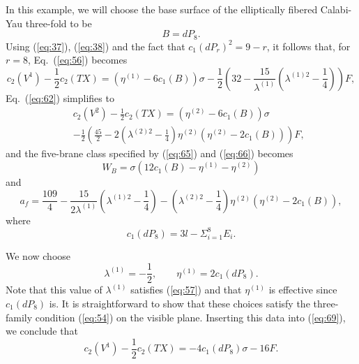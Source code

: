 \documentclass[a4paper,12pt]{article}
\numberwithin{equation}{section}
\theoremstyle{plain}
\begin{document}
In this example, we will choose the base surface of the elliptically fibered
Calabi-Yau three-fold to be
%
\begin{equation}
B=dP_{8}.
\label{eq:68}
\end{equation}
%
Using (\ref{eq:37}), (\ref{eq:38}) and the fact that $c_{1}(dP_{r})^{2}=9-r$, it
follows that, for $r=8$, Eq.~(\ref{eq:56}) becomes 
%
\begin{equation}
c_{2}(V^{1})-\frac{1}{2}c_{2}(TX)=(\eta^{(1)}-6c_{1}(B))\sigma
-\frac{1}{2}\left(32-\frac{15}{\lambda^{(1)}}
\left(\lambda^{(1)2}-\frac{1}{4}\right)\right)F,
\label{eq:69}
\end{equation}
%
Eq.~(\ref{eq:62}) simplifies to
%
\begin{eqnarray}
\nonumber
& & c_{2}(V^{2})-\frac{1}{2}c_{2}(TX)=(\eta^{(2)}-6c_{1}(B))\sigma \\
& & -\frac{1}{2}\left(\frac{45}{2} -2\left(\lambda^{(2)2}-\frac{1}{4}\right)\eta^{(2)}(\eta^{(2)}-2c_{1}(B))\right)F,
\label{eq:70}
\end{eqnarray}
%
and the five-brane class specified by (\ref{eq:65}) and (\ref{eq:66}) becomes
%
\begin{equation}
W_{B}=\sigma(12c_{1}(B)-\eta^{(1)}-\eta^{(2)})
\label{eq:71}
\end{equation}
%
and
%
\begin{equation}
a_{f}= \frac{109}{4}
-\frac{15}{2\lambda^{(1)}}\left(\lambda^{(1)2}-\frac{1}{4}\right)
-\left(\lambda^{(2)2}-\frac{1}{4}\right)\eta^{(2)}(\eta^{(2)}-2c_{1}(B)),
\label{eq:72}
\end{equation}
%
where
%
\begin{equation}
c_{1}(dP_{8})=3l-\Sigma_{i=1}^{8}E_{i}.
\label{eq:73}
\end{equation}
%

We now choose
%
\begin{equation}
\lambda^{(1)}=-\frac{1}{2}, \qquad \eta^{(1)}=2c_{1}(dP_{8}).
\label{eq:74}
\end{equation}
%
Note that this value of $\lambda^{(1)}$ 
satisfies (\ref{eq:57}) and that
$\eta^{(1)}$ is effective since $c_{1}(dP_{8})$ is. It is straightforward to
show that these choices satisfy the three-family condition (\ref{eq:54}) on
the visible plane. Inserting this data into (\ref{eq:69}), we conclude that
%
\begin{equation}
c_{2}(V^{1})-\frac{1}{2}c_{2}(TX)=-4c_{1}(dP_{8})\sigma-16F.
\label{eq:75}
\end{equation}
%
\end{document}
